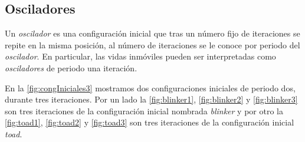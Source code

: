 \documentclass[../proyecto.tex]{memoir}
\begin{document}
\subsection{Osciladores}


Un \textit{oscilador} es una configuración inicial que tras un número fijo de iteraciones se repite en la misma posición, al número de iteraciones se le conoce por periodo del \textit{oscilador}. En particular, las vidas inmóviles pueden ser interpretadas como \textit{osciladores} de periodo una iteración.

En la \autoref{fig:congIniciales3} mostramos dos configuraciones iniciales de periodo dos, durante tres iteraciones. Por un lado la \autoref{fig:blinker1}, \autoref{fig:blinker2} y \autoref{fig:blinker3} son tres iteraciones de la configuración inicial nombrada \textit{blinker} y por otro la \autoref{fig:toad1}, \autoref{fig:toad2} y \autoref{fig:toad3} son tres iteraciones de la configuración inicial \textit{toad}.
\end{document}
